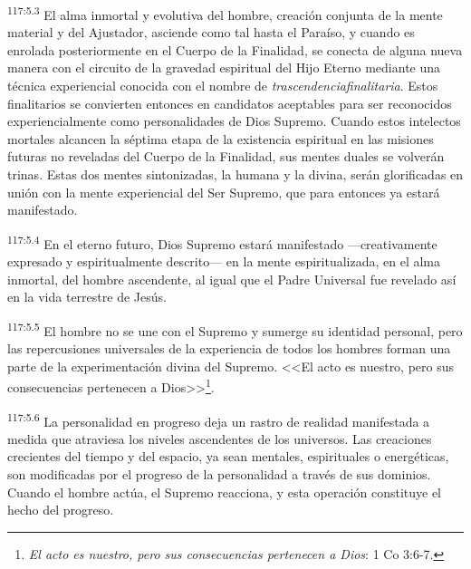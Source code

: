 \documentclass[twoside, 11pt]{book}
\begin{document}
\par
\textsuperscript{117:5.3} El alma inmortal y evolutiva del hombre, creación conjunta de la mente material y del Ajustador, asciende como tal hasta el Paraíso, y cuando es enrolada posteriormente en el Cuerpo de la Finalidad, se conecta de alguna nueva manera con el circuito de la gravedad espiritual del Hijo Eterno mediante una técnica experiencial conocida con el nombre de \textit{trascendenciafinalitaria}. Estos finalitarios se convierten entonces en candidatos aceptables para ser reconocidos experiencialmente como personalidades de Dios Supremo. Cuando estos intelectos mortales alcancen la séptima etapa de la existencia espiritual en las misiones futuras no reveladas del Cuerpo de la Finalidad, sus mentes duales se volverán trinas. Estas dos mentes sintonizadas, la humana y la divina, serán glorificadas en unión con la mente experiencial del Ser Supremo, que para entonces ya estará manifestado.

\par
\textsuperscript{117:5.4} En el eterno futuro, Dios Supremo estará manifestado ---creativamente expresado y espiritualmente descrito--- en la mente espiritualizada, en el alma inmortal, del hombre ascendente, al igual que el Padre Universal fue revelado así en la vida terrestre de Jesús.

\par
\textsuperscript{117:5.5} El hombre no se une con el Supremo y sumerge su identidad personal, pero las repercusiones universales de la experiencia de todos los hombres forman una parte de la experimentación divina del Supremo. <<El acto es nuestro, pero sus consecuencias pertenecen a Dios>>\footnote{\textit{El acto es nuestro, pero sus consecuencias pertenecen a Dios}: 1 Co 3:6-7.}.

\par
\textsuperscript{117:5.6} La personalidad en progreso deja un rastro de realidad manifestada a medida que atraviesa los niveles ascendentes de los universos. Las creaciones crecientes del tiempo y del espacio, ya sean mentales, espirituales o energéticas, son modificadas por el progreso de la personalidad a través de sus dominios. Cuando el hombre actúa, el Supremo reacciona, y esta operación constituye el hecho del progreso.
\end{document}

